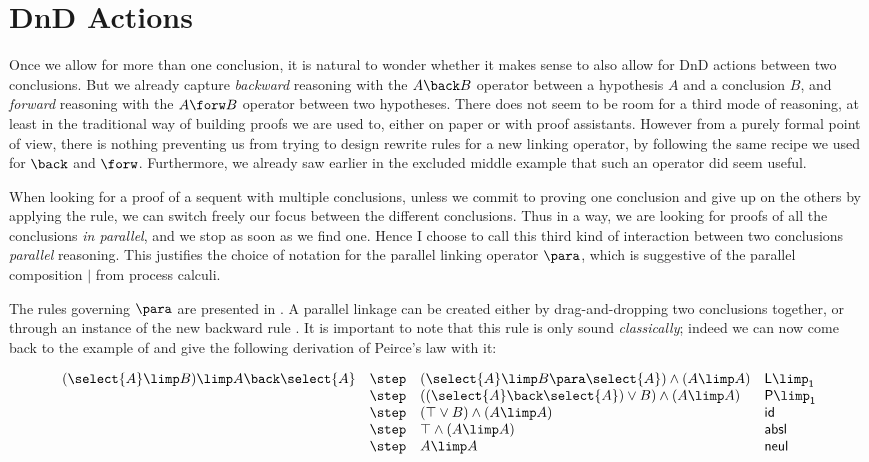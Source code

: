 \section{DnD Actions}

Once we allow for more than one conclusion, it is natural to wonder whether it
makes sense to also allow for DnD actions between two conclusions. But we
already capture \emph{backward} reasoning with the $A \back B$ operator between
a hypothesis $A$ and a conclusion $B$, and \emph{forward} reasoning with the $A
\forw B$ operator between two hypotheses. There does not seem to be room for a
third mode of reasoning, at least in the traditional way of building proofs we
are used to, either on paper or with proof assistants. However from a purely
formal point of view, there is nothing preventing us from trying to design
rewrite rules for a new linking operator, by following the same recipe we used
for $\back$ and $\forw$. Furthermore, we already saw earlier in the excluded
middle example that such an operator did seem useful.

When looking for a proof of a sequent with multiple conclusions, unless we
commit to proving one conclusion and give up on the others by applying the
{} rule, we can switch freely our focus between the different
conclusions. Thus in a way, we are looking for proofs of all the conclusions
\emph{in parallel}, and we stop as soon as we find one. Hence I choose to
call this third kind of interaction between two conclusions \emph{parallel}
reasoning. This justifies the choice of notation for the parallel linking
operator $\para$, which is suggestive of the parallel composition $\mid$ from
process calculi.

The rules governing $\para$ are presented in . A parallel
linkage can be created either by drag-and-dropping two conclusions together, or
through an instance of the new backward rule {}. It is
important to note that this rule is only sound \emph{classically}; indeed we can
now come back to the example of  and give the following
derivation of Peirce's law with it:

$$
\begin{array}{llll}
  (\select{A} \limp B) \limp A \back \select{A}
  &\step& (\select{A} \limp B \para \select{A}) \land (A \limp A) &\mathsf{L{\limp}_1} \\
  &\step& ((\select{A} \back \select{A}) \lor B) \land (A \limp A) &\mathsf{P{\limp}_1} \\
  &\step& (\top \lor B) \land (A \limp A) &\mathsf{id} \\
  &\step& \top \land (A \limp A) &\mathsf{absl} \\
  &\step& A \limp A &\mathsf{neul}
\end{array}
$$

